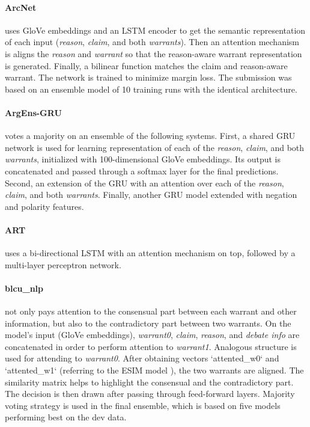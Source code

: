 \paragraph{ArcNet}
uses GloVe embeddings and an LSTM encoder to get the semantic representation of each input (\emph{reason}, \emph{claim}, and both \emph{warrants}). Then an attention mechanism is aligns the \emph{reason} and \emph{warrant} so that the reason-aware warrant representation is generated. Finally, a bilinear function matches the claim and reason-aware warrant. The network is trained to minimize margin loss. The submission was based on an ensemble model of 10 training runs with the identical architecture.


\paragraph{ArgEns-GRU}
votes a majority on an ensemble of the following systems. First, a shared GRU network is used for learning representation of each of the \emph{reason}, \emph{claim}, and both \emph{warrants}, initialized with 100-dimensional GloVe embeddings. Its output is concatenated and passed through a softmax layer for the final predictions. Second, an extension of the GRU with an attention over each of the \emph{reason}, \emph{claim}, and both \emph{warrants}. Finally, another GRU model extended with negation and polarity features.


\paragraph{ART}
uses a bi-directional LSTM with an attention mechanism on top, followed by a multi-layer perceptron network.


\paragraph{blcu\_nlp}
not only pays attention to the consensual part between each warrant and other information, but also to the contradictory part between two warrants. On the model's input (GloVe embeddings), \emph{warrant0}, \emph{claim}, \emph{reason}, and \emph{debate info} are concatenated in order to perform attention to \emph{warrant1}. Analogous structure is used for attending to \emph{warrant0}. After obtaining vectors `attented\_w0` and `attented\_w1` (referring to the ESIM model \cite{Chen.et.al.2017.ACL.ESIM}), the two warrants are aligned. The similarity matrix helps to highlight the consensual and the contradictory part. The decision is then drawn after passing through feed-forward layers. Majority voting strategy is used in the final ensemble, which is based on five models performing best on the dev data.


